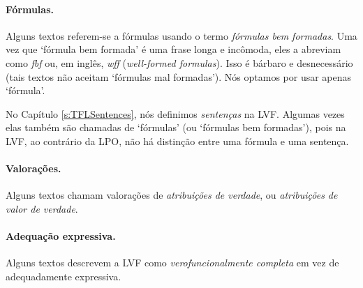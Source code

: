 
\paragraph{Fórmulas.} Alguns textos referem-se a fórmulas usando o termo \emph{fórmulas bem formadas}. Uma vez que `fórmula bem formada' é uma frase longa e incômoda, eles a abreviam como \emph{fbf} ou, em inglês, \emph{wff} (\emph{well-formed formulas}). Isso é bárbaro e desnecessário (tais textos não aceitam `fórmulas mal formadas'). Nós optamos por usar apenas `fórmula'.


No Capítulo \ref{s:TFLSentences}, nós definimos \emph{sentenças} na LVF. Algumas vezes elas também são chamadas de `fórmulas' (ou `fórmulas bem formadas'), pois na LVF, ao contrário da LPO, não há distinção entre uma fórmula e uma sentença. 

\paragraph{Valorações.} Alguns textos chamam valorações de \emph{atribuições de verdade}, ou \emph{atribuições de valor de verdade}.

\paragraph{Adequação expressiva.} Alguns textos descrevem a LVF como \emph{verofuncionalmente completa} em vez de adequadamente expressiva.

